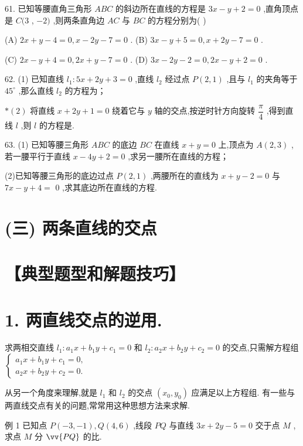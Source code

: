 61. 已知等腰直角三角形 ${ABC}$ 的斜边所在直线的方程是 ${3x} - y + 2 = 0$ ,直角顶点是 $C(3$ , $- 2)$ ,则两条直角边 ${AC}$ 与 ${BC}$ 的方程分别为(   )

(A) ${2x} + y - 4 = 0,x - {2y} - 7 = 0$ . (B) ${3x} - y + 5 = 0,x + {2y} - 7 = 0$ .

(C) ${2x} - y + 4 = 0,{2x} + y - 7 = 0$ . (D) ${3x} - {2y} - 2 = 0,{2x} - y + 2 = 0$ .

62. (1) 已知直线 ${l}_{1} : {5x} + {2y} + 3 = 0$ ,直线 ${l}_{2}$ 经过点 $P\left( {2,1}\right)$ ,且与 ${l}_{1}$ 的夹角等于 ${45}^{ \circ  }$ ,那么直线 ${l}_{2}$ 的方程为\blkda{}；

$* \left( 2\right)$ 将直线 $x + {2y} + 1 = 0$ 绕着它与 $y$ 轴的交点,按逆时针方向旋转 $\dfrac{\pi }{4}$ ,得到直线 $l$ ,则 $l$ 的方程是\blkda{}.

63. (1) 已知等腰三角形 ${ABC}$ 的底边 ${BC}$ 在直线 $x + y = 0$ 上,顶点为 $A\left( {2,3}\right)$ ,若一腰平行于直线 $x - {4y} + 2 = 0$ ,求另一腰所在直线的方程；

(2)已知等腰三角形的底边过点 $P\left( {2,1}\right)$ ,两腰所在的直线为 $x + y - 2 = 0$ 与 ${7x} - y + 4 =$ 0 ,求其底边所在直线的方程.

\section*{(三) 两条直线的交点}

\section*{【典型题型和解题技巧】}

\section*{1. 两直线交点的逆用.}

求两相交直线 ${l}_{1} : {a}_{1}x + {b}_{1}y + {c}_{1} = 0$ 和 ${l}_{2} : {a}_{2}x + {b}_{2}y + {c}_{2} = 0$ 的交点,只需解方程组 $\left\{  \begin{array}{l} {a}_{1}x + {b}_{1}y + {c}_{1} = 0, \\  {a}_{2}x + {b}_{2}y + {c}_{2} = 0. \end{array}\right.$

从另一个角度来理解,就是 ${l}_{1}$ 和 ${l}_{2}$ 的交点 $\left( {{x}_{0},{y}_{0}}\right)$ 应满足以上方程组. 有一些与两直线交点有关的问题,常常用这种思想方法来求解.

例 1 已知点 $P\left( {-3, - 1}\right) ,Q\left( {4,6}\right)$ ,线段 ${PQ}$ 与直线 ${3x} + {2y} - 5 = 0$ 交于点 $M$ ,求点 $M$ 分 $\vv{PQ}$ 的比.

